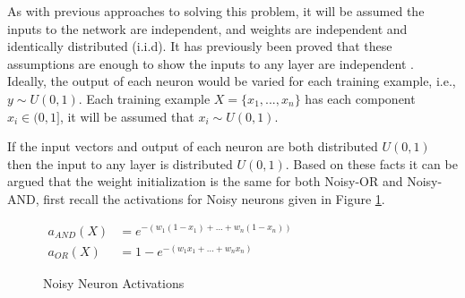 As with previous approaches to solving this problem, it will be assumed the inputs to the network are independent, and weights are independent and identically distributed (i.i.d). It has previously been proved that these assumptions are enough to show the inputs to any layer are independent \cite{kumar2017weight}.\\

Ideally, the output of each neuron would be varied for each training example, i.e., $y \sim U(0,1)$. Each training example $X = \{x_1, ..., x_n\}$ has each component $x_i \in (0,1]$, it will be assumed that $x_i \sim U(0,1)$. 

\noindent
\begin{minipage}[t]{0.55\textwidth}
\vspace{0px}
If the input vectors and output of each neuron are both distributed $U(0,1)$ then the input to any layer is distributed $U(0,1)$. Based on these facts it can be argued that the weight initialization is the same for both Noisy-OR and Noisy-AND, first recall the activations for Noisy neurons given in Figure \ref{fig:recall-noisy-activations}.\\
\end{minipage}
\hspace{0.05\textwidth}
\begin{minipage}[t]{0.4\textwidth}
\vspace{0px}
\begin{figure}[H]
\vspace{0px}
{\centering
$ \displaystyle
\begin{aligned}
a_{AND}(X) &= e^{-(w_1(1 - x_1) + ... + w_n(1 - x_n))}\\
a_{OR}(X) &= 1 - e^{-(w_1x_1 + ... + w_nx_n)}
\end{aligned}
$
\par}
\caption{Noisy Neuron Activations}
\label{fig:recall-noisy-activations}
\end{figure}
\end{minipage}

